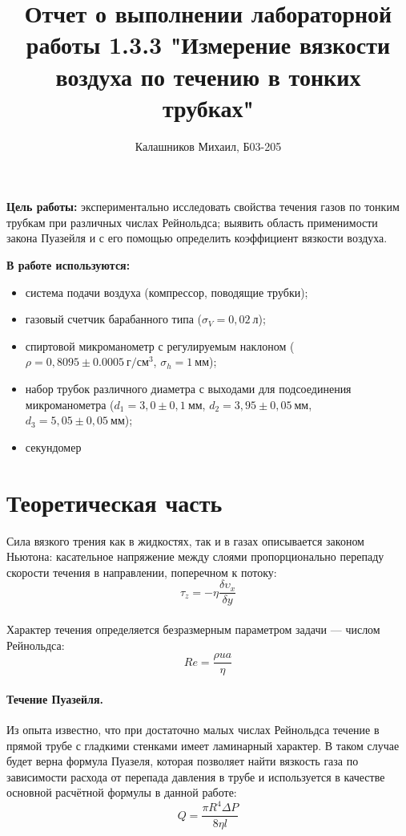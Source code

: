 \documentclass[14pt, a4paper]{report}
\title{\textbf{Отчет о выполнении лабораторной работы 1.3.3 "Измерение вязкости воздуха по течению в тонких трубках"}}
\author{Калашников Михаил, Б03-205}
\date{}
\begin{document}
\maketitle

\textbf{Цель работы:}
экспериментально исследовать свойства течения газов по тонким трубкам при различных числах Рейнольдса; выявить область применимости закона Пуазейля и с его помощью определить коэффициент вязкости воздуха.
\newline

\textbf{В работе используются:}
\begin{itemize}
\item система подачи воздуха (компрессор, поводящие трубки); 
\item газовый счетчик барабанного типа ($\sigma_V=0,02\ л$);
\item спиртовой микроманометр с регулируемым наклоном ($\rho=0,8095\pm0.0005\ г/см^3$, $\sigma_h=1\ мм$);
\item набор трубок различного диаметра с выходами для подсоединения микроманометра ($d_1=3,0\pm0,1\ мм$, $d_2=3,95\pm0,05\ мм$, $d_3=5,05\pm0,05\ мм$);
\item секундомер
\end{itemize}

\section{Теоретическая часть}
Сила вязкого трения как в жидкостях, так и в газах описывается законом
Ньютона: касательное напряжение между слоями пропорционально перепаду
скорости течения в направлении, поперечном к потоку:
\[\tau_z = -\eta \frac{\delta \upsilon_x}{\delta y}\]
\paragraph{}
Характер течения определяется безразмерным параметром задачи — числом Рейнольдса:
\[Re =  \frac{\rho u a}{\eta}\]
\paragraph{Течение Пуазейля.} Из опыта известно, что при достаточно малых числах
Рейнольдса течение в прямой трубе с гладкими стенками имеет ламинарный
характер. В таком случае будет верна формула Пуазеля, которая позволяет найти вязкость газа по зависимости расхода от перепада давления в трубе и используется в качестве основной расчётной формулы в данной работе:
\[Q = \frac{\pi R^{4} \Delta P}{8 \eta l}\]	
\end{document}
